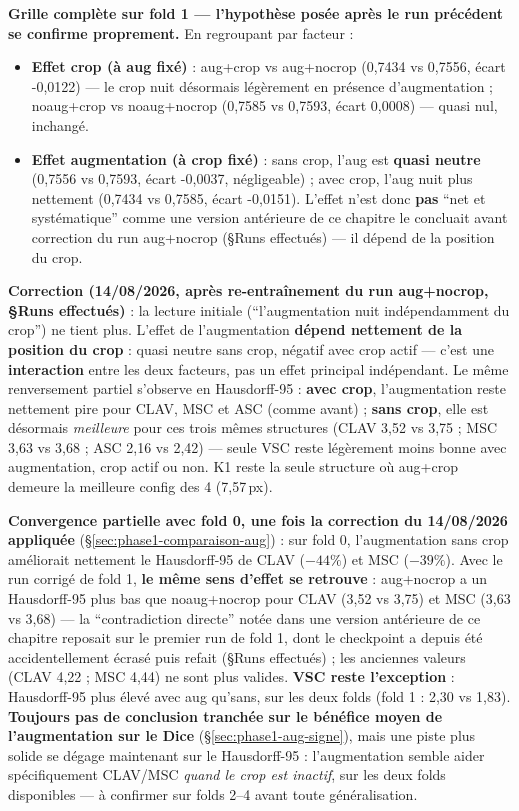\textbf{Grille complète sur fold 1 --- l'hypothèse posée après le run précédent se
confirme proprement.} En regroupant par facteur :

\begin{itemize}[nosep]
    \item \textbf{Effet crop (à aug fixé)} : aug+crop vs aug+nocrop (0,7434 vs
        0,7556, écart -0,0122) --- le crop nuit désormais légèrement en présence
        d'augmentation ; noaug+crop vs noaug+nocrop (0,7585 vs 0,7593, écart 0,0008)
        --- quasi nul, inchangé.
    \item \textbf{Effet augmentation (à crop fixé)} : sans crop, l'aug est
        \textbf{quasi neutre} (0,7556 vs 0,7593, écart -0,0037, négligeable) ; avec
        crop, l'aug nuit plus nettement (0,7434 vs 0,7585, écart -0,0151). L'effet
        n'est donc \textbf{pas} ``net et systématique'' comme une version antérieure
        de ce chapitre le concluait avant correction du run aug+nocrop (\S Runs
        effectués) --- il dépend de la position du crop.
\end{itemize}

\textbf{Correction (14/08/2026, après re-entraînement du run aug+nocrop, \S Runs
effectués)} : la lecture initiale (``l'augmentation nuit indépendamment du crop'')
ne tient plus. L'effet de l'augmentation \textbf{dépend nettement de la position du
crop} : quasi neutre sans crop, négatif avec crop actif --- c'est une
\textbf{interaction} entre les deux facteurs, pas un effet principal indépendant.
Le même renversement partiel s'observe en Hausdorff-95 : \textbf{avec crop},
l'augmentation reste nettement pire pour CLAV, MSC et ASC (comme avant) ;
\textbf{sans crop}, elle est désormais \emph{meilleure} pour ces trois mêmes
structures (CLAV 3,52 vs 3,75 ; MSC 3,63 vs 3,68 ; ASC 2,16 vs 2,42) --- seule VSC
reste légèrement moins bonne avec augmentation, crop actif ou non. K1 reste la seule
structure où aug+crop demeure la meilleure config des 4 (7,57\,px).

\textbf{Convergence partielle avec fold 0, une fois la correction du 14/08/2026
appliquée} (\S\ref{sec:phase1-comparaison-aug}) : sur fold 0, l'augmentation sans
crop améliorait nettement le Hausdorff-95 de CLAV ($-44\%$) et MSC ($-39\%$). Avec le
run corrigé de fold 1, \textbf{le même sens d'effet se retrouve} : aug+nocrop a un
Hausdorff-95 plus bas que noaug+nocrop pour CLAV (3,52 vs 3,75) et MSC (3,63 vs 3,68)
--- la ``contradiction directe'' notée dans une version antérieure de ce chapitre
reposait sur le premier run de fold 1, dont le checkpoint a depuis été
accidentellement écrasé puis refait (\S Runs effectués) ; les anciennes valeurs
(CLAV 4,22 ; MSC 4,44) ne sont plus valides. \textbf{VSC reste l'exception} :
Hausdorff-95 plus élevé avec aug qu'sans, sur les deux folds (fold 1 : 2,30 vs 1,83).
\textbf{Toujours pas de conclusion tranchée sur le bénéfice moyen de l'augmentation
sur le Dice} (\S\ref{sec:phase1-aug-signe}), mais une piste plus solide se dégage
maintenant sur le Hausdorff-95 : l'augmentation semble aider spécifiquement
CLAV/MSC \emph{quand le crop est inactif}, sur les deux folds disponibles --- à
confirmer sur folds 2--4 avant toute généralisation.

